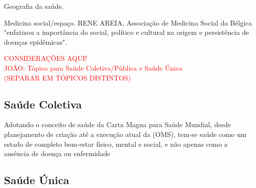 \indent Geografia da saúde.

\indent Medicina social/espaço. RENE AREIA, Associação de Medicina Social da Bélgica "enfatizou a importância do social, político e cultural na origem e persistência de doenças epidêmicas".

\begin{center}
\textcolor{red}{CONSIDERAÇÕES AQUI!}\\
\indent \textcolor{red}{JOÃO: Tópico para Saúde Coletiva/Pública e Saúde Única\\(SEPARAR EM TÓPICOS DISTINTOS)}\\
\end{center}


\subsection{Saúde Coletiva}

\indent Adotando o conceito de saúde da Carta Magna para Saúde Mundial, desde planejamento de criação até a execução atual da  (\acrshort{OMS}), tem-se saúde como um estado de completo bem-estar físico, mental e social, e não apenas como a ausência de doença ou enfermidade \cite{ParranHEALTH}

\subsection{Saúde Única}



